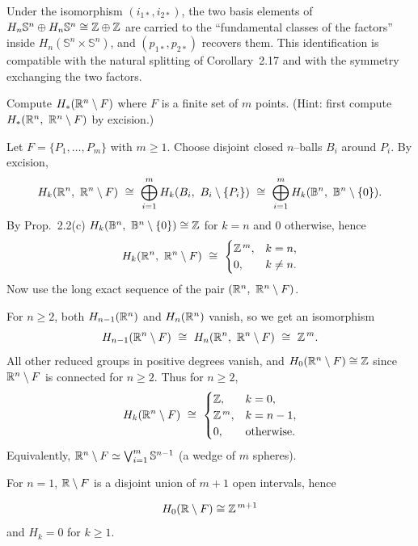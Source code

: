 \begin{remark}\label{remark 2.19}
Under the isomorphism $(i_{1*},i_{2*})$, the two basis elements of
$H_n\mathbb{S}^n\oplus H_n\mathbb{S}^n\cong\Bbb Z\oplus\Bbb Z$ are carried to the “fundamental
classes of the factors” inside $H_n(\mathbb{S}^n\times \mathbb{S}^n)$, and $(p_{1*},p_{2*})$
recovers them. This identification is compatible with the natural splitting
of Corollary~2.17 and with the symmetry exchanging the two factors.
\end{remark}


\begin{exercise}[2.13.1]
Compute $H_*(\Bbb R^n\setminus F)$ where $F$ is a finite set of $m$ points.
(Hint: first compute $H_*(\Bbb R^n,\ \Bbb R^n\setminus F)$ by excision.)
\end{exercise}

\begin{solution}
Let $F=\{P_1,\dots,P_m\}$ with $m\ge 1$. Choose disjoint closed $n$–balls
$B_i$ around $P_i$. By excision,
\[
H_k(\Bbb R^n,\ \Bbb R^n\setminus F)\ \cong\
\bigoplus_{i=1}^m H_k(B_i,\ B_i\setminus\{P_i\})
\ \cong\ \bigoplus_{i=1}^m H_k(\mathbb{B}^n,\ \mathbb{B}^n\setminus\{0\}).
\]
By Prop.\ 2.2(c)
$H_k(\B^n,\ \B^n\setminus\{0\})\cong \Bbb Z$ for $k=n$ and $0$ otherwise, hence
\[
H_k(\Bbb R^n,\ \Bbb R^n\setminus F)\ \cong\
\begin{cases}
\Bbb Z^{\,m},& k=n,\\
0,& k\ne n.
\end{cases}
\]
Now use the long exact sequence of the pair $(\Bbb R^n,\ \Bbb R^n\setminus F)$.

For $n\ge 2$, both $H_{n-1}(\Bbb R^n)$ and $H_n(\Bbb R^n)$ vanish, so we get an
isomorphism
\[
H_{n-1}(\Bbb R^n\setminus F)\ \cong\ H_n(\Bbb R^n,\ \Bbb R^n\setminus F)
\ \cong\ \Bbb Z^{\,m}.
\]
All other reduced groups in positive degrees vanish, and
$H_0(\Bbb R^n\setminus F)\cong\Bbb Z$ since $\Bbb R^n\setminus F$ is connected for $n\ge 2$.
Thus for $n\ge 2$,
\[
H_k(\Bbb R^n\setminus F)\ \cong\
\begin{cases}
\Bbb Z,& k=0,\\
\Bbb Z^{\,m},& k=n-1,\\
0,& \text{otherwise.}
\end{cases}
\]
Equivalently, $\Bbb R^n\setminus F\simeq \bigvee_{i=1}^{m} \mathbb{S}^{n-1}$ (a wedge of $m$ spheres).

For $n=1$, $\Bbb R\setminus F$ is a disjoint union of $m{+}1$ open intervals, hence

\[H_0(\Bbb R\setminus F)\cong \Bbb Z^{\,m+1}\]
and $H_k=0$ for $k\ge 1$.
\end{solution}


